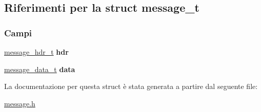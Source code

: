 \hypertarget{structmessage__t}{}\subsection{Riferimenti per la struct message\+\_\+t}
\label{structmessage__t}
\subsubsection*{Campi}
\begin{DoxyCompactItemize}
\item 
\mbox{\label{structmessage__t_a6c9e3c76c26fd15afd27fca633875978}} 
\mbox{\hyperlink{structmessage__hdr__t}{message\+\_\+hdr\+\_\+t}} {\bfseries hdr}
\item 
\mbox{\label{structmessage__t_a4246f40b480c7d84ff6319ef2ae7b305}} 
\mbox{\hyperlink{structmessage__data__t}{message\+\_\+data\+\_\+t}} {\bfseries data}
\end{DoxyCompactItemize}


La documentazione per questa struct è stata generata a partire dal seguente file\+:\begin{DoxyCompactItemize}
\item 
\mbox{\hyperlink{message_8h}{message.\+h}}\end{DoxyCompactItemize}
